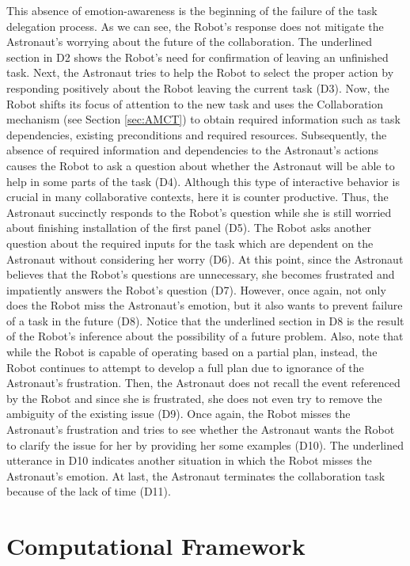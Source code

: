 This absence of emotion-awareness is the beginning of the failure of the task
delegation process. As we can see, the Robot's response does not mitigate the
Astronaut's worrying about the future of the collaboration. The underlined
section in D2 shows the Robot's need for confirmation of leaving an unfinished
task. Next, the Astronaut tries to help the Robot to select the proper action by
responding positively about the Robot leaving the current task (D3). Now, the
Robot shifts its focus of attention to the new task and uses the Collaboration
mechanism (see Section \ref{sec:AMCT}) to obtain required information such as
task dependencies, existing preconditions and required resources. Subsequently,
the absence of required information and dependencies to the Astronaut's actions
causes the Robot to ask a question about whether the Astronaut will be able to
help in some parts of the task (D4). Although this type of interactive behavior
is crucial in many collaborative contexts, here it is counter productive. Thus,
the Astronaut succinctly responds to the Robot's question while she is still
worried about finishing installation of the first panel (D5). The Robot asks
another question about the required inputs for the task which are dependent on
the Astronaut without considering her worry (D6). At this point, since the
Astronaut believes that the Robot's questions are unnecessary, she becomes
frustrated and impatiently answers the Robot's question (D7). However, once
again, not only does the Robot miss the Astronaut's emotion, but it also wants
to prevent failure of a task in the future (D8). Notice that the underlined
section in D8 is the result of the Robot's inference about the possibility of a
future problem. Also, note that while the Robot is capable of operating based on
a partial plan, instead, the Robot continues to attempt to develop a full plan
due to ignorance of the Astronaut's frustration. Then, the Astronaut does not
recall the event referenced by the Robot and since she is frustrated, she does
not even try to remove the ambiguity of the existing issue (D9). Once again, the
Robot misses the Astronaut's frustration and tries to see whether the Astronaut
wants the Robot to clarify the issue for her by providing her some examples
(D10). The underlined utterance in D10 indicates another situation in which the
Robot misses the Astronaut's emotion. At last, the Astronaut terminates the
collaboration task because of the lack of time (D11).

\section{Computational Framework}
\label{sec:computational-framework}

